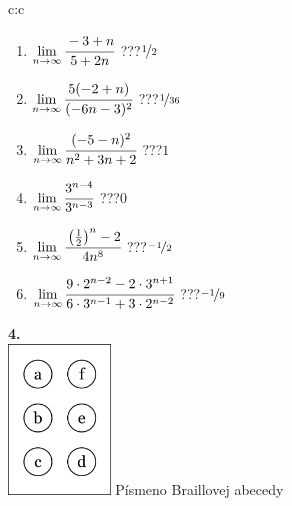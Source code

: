 \documentclass[10pt]{report}
\begin{document}
\begin{tabular}{c:c}
\begin{minipage}[c][104.5mm][t]{0.5\linewidth}
\begin{center}
\begin{minipage}{0.79\linewidth}
\begin{center}
\begin{varwidth}{\linewidth}
\begin{enumerate}
\normalsize
\item $\lim\limits_{n\to\infty}\cfrac{-3+n}{5+2n}$\quad \dotfill\; ???\;\dotfill \quad $\nicefrac{1}{2}$
\item $\lim\limits_{n\to\infty}\cfrac{5(-2+n)}{(-6n-3)^2}$\quad \dotfill\; ???\;\dotfill \quad $\nicefrac{1}{36}$
\item $\lim\limits_{n\to\infty}\cfrac{(-5-n)^2}{n^2+3n+2}$\quad \dotfill\; ???\;\dotfill \quad $1$
\item $\lim\limits_{n\to\infty}\cfrac{3^{n-4}}{3^{n-3}}$\quad \dotfill\; ???\;\dotfill \quad $0$
\item $\lim\limits_{n\to\infty}\cfrac{\left(\frac{1}{2}\right)^n -2}{4n^{8}}$\quad \dotfill\; ???\;\dotfill \quad $\nicefrac{-1}{2}$
\item $\lim\limits_{n\to\infty}\cfrac{9\cdot 2^{n-2}-2\cdot 3^{n+1}}{6\cdot 3^{n-1}+3\cdot 2^{n-2}}$\quad \dotfill\; ???\;\dotfill \quad $\nicefrac{-1}{9}$
\end{enumerate}
\end{varwidth}
\end{center}
\end{minipage}
\begin{minipage}{0.20\linewidth}
\begin{center}
{\Huge\bfseries 4.} \\[2mm]
\includegraphics[height=40mm]{../images/braille.png}
{\small Písmeno Braillovej abecedy}
\end{center}
\end{minipage}
\end{center}
\end{minipage}
%
\end{tabular}
\newpage
\thispagestyle{empty}
\end{document}
